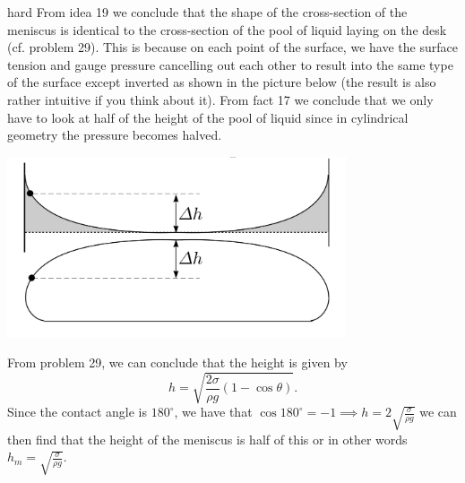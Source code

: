 \begin{solution}{hard}
From idea 19 we conclude that the shape of the cross-section of the meniscus is identical to the cross-section of the pool of liquid laying on the desk (cf. problem 29). This is because on each point of the surface, we have the surface tension and gauge pressure cancelling out each other to result into the same type of the surface except inverted as shown in the picture below (the result is also rather intuitive if you think about it). From fact 17 we conclude that we only have to look at half of the height of the pool of liquid since in cylindrical geometry the pressure becomes halved.
\begin{center}
    \includegraphics[width=10cm]{pr30.png}
\end{center}
From problem 29, we can conclude that the height is given by 
\[h = \sqrt{\frac{2\sigma}{\rho g} (1 -\cos\theta)}.\]
Since the contact angle is $180^{\circ}$, we have that $\cos 180^{\circ} = -1\implies h = 2\sqrt{\frac{\sigma}{\rho g}}$ we can then find that the height of the meniscus is half of this or in other words $h_m = \boxed{\sqrt{\frac{\sigma}{\rho g}}}$.
\end{solution}